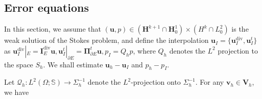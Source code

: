 \documentclass[review,hidelinks,onefignum,onetabnum]{siamart251216}
\begin{document}
\subsection{Error equations}
In this section, we assume that \((\boldsymbol{u}, p) \in (\boldsymbol{H}^{k+1} \cap \boldsymbol{H}_0^1) \times (H^k \cap L_0^2)\) is the weak solution of the Stokes problem, and define the interpolation \(\boldsymbol{u}_I = \{\boldsymbol{u}_I^{\mathrm{div}}, \boldsymbol{u}_I^t\}\) as \(\boldsymbol{u}_I^{\mathrm{div}}|_E = \boldsymbol{I}_E^{\mathrm{div}} \boldsymbol{u}, \boldsymbol{u}_I^t|_{\partial E} = \boldsymbol{\Pi}_{\partial E}^t \boldsymbol{u}, p_I = Q_h p\), where \(Q_h\) denotes the \(L^2\) projection to the space \(S_h\). We shall estimate \(\boldsymbol{u}_h - \boldsymbol{u}_I\) and \(p_h - p_I\).

Let \(\mathcal{Q}_h: L^2(\Omega;\mathbb S)\to \Sigma_h^{-1}\) denote the \(L^2\)-projection onto \(\Sigma_h^{-1}\).
For any \(\boldsymbol{v}_h \in \boldsymbol{V}_h\), we have
\end{document}
